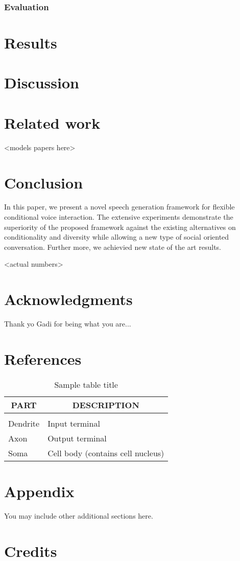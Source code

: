 \documentclass[11pt,a4paper]{article}
\begin{document}
\subsubsection{Evaluation} %

\section{Results}

\section{Discussion}

\section{Related work}
<models papers here> 

\section{Conclusion}
In this paper, we present a novel speech generation framework for flexible conditional voice interaction. 
The extensive experiments demonstrate the superiority of the proposed framework against the existing alternatives on conditionality and diversity while allowing a new type of social oriented conversation.
Further more, we achievied new state of the art results. 

<actual numbers>

\section{Acknowledgments}
Thank yo Gadi for being what you are...

\section{References}


\begin{table}[t]
\caption{Sample table title}
\label{sample-table}
\begin{center}
\begin{tabular}{ll}
\multicolumn{1}{c}{\bf PART}  &\multicolumn{1}{c}{\bf DESCRIPTION}
\\ \hline \\
Dendrite         &Input terminal \\
Axon             &Output terminal \\
Soma             &Cell body (contains cell nucleus) \\
\end{tabular}
\end{center}
\end{table}






\appendix
\section{Appendix}
You may include other additional sections here. 

\section{Credits}
\end{document}
